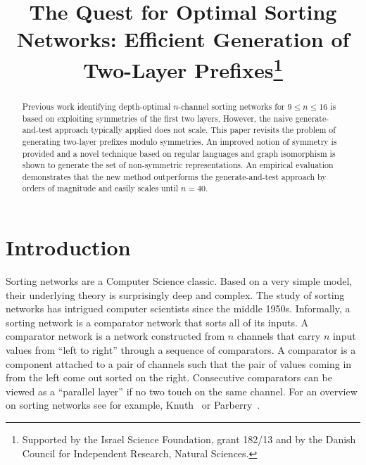 \documentclass[10pt]{IEEEtran}
\begin{document}
\title{The Quest for Optimal Sorting Networks: Efficient Generation of
       Two-Layer Prefixes\thanks{Supported by 
       the Israel Science Foundation, grant 182/13 and by
       the Danish Council for Independent Research, Natural Sciences.}}
\author{
\and
{}
}
\maketitle


\begin{abstract}
  Previous work identifying depth-optimal $n$-channel sorting networks
  for $9\leq n \leq 16$ is based on exploiting symmetries of the first
  two layers.  However, the naive generate-and-test approach typically
  applied does not scale.
This paper revisits the problem of generating two-layer prefixes
  modulo symmetries. An improved notion of symmetry is provided and a
  novel technique based on regular languages and graph isomorphism is
  shown to generate the set of non-symmetric representations.  An
  empirical evaluation demonstrates that the new method outperforms
  the generate-and-test approach by orders of
  magnitude and easily scales until $n=40$.
\end{abstract}


\section{Introduction}

Sorting networks are a Computer Science classic. Based on a very
simple model, their underlying theory is surprisingly deep and
complex.  The study of sorting networks has intrigued computer
scientists since the middle 1950s. 
Informally, a sorting network is a comparator network that sorts all of
its inputs. A comparator network is a network constructed from $n$
channels that carry $n$ input values from ``left to right'' through a
sequence of comparators. A comparator is a component attached to a
pair of channels such that the pair of values coming in from the left
come out sorted on the right. Consecutive comparators can be viewed as
a ``parallel layer'' if no two touch on the same channel.
For an overview on sorting networks see for example, Knuth~\cite{Knuth73}
or Parberry~\cite{Parberry87}.
\end{document}
